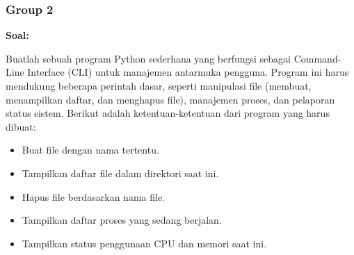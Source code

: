 \documentclass[12pt]{article}
\begin{document}
\subsubsection{Group 2}
\textbf{Soal:}
\par Buatlah sebuah program Python sederhana yang berfungsi sebagai Command-Line Interface (CLI) untuk manajemen antarmuka pengguna. Program ini harus mendukung beberapa perintah dasar, seperti manipulasi file (membuat, menampilkan daftar, dan menghapus file), manajemen proses, dan pelaporan status sistem. Berikut adalah ketentuan-ketentuan dari program yang harus dibuat:
\begin{itemize}
    \item Buat file dengan nama tertentu.
    \item Tampilkan daftar file dalam direktori saat ini.
    \item Hapus file berdasarkan nama file.
    \item Tampilkan daftar proses yang sedang berjalan.
    \item Tampilkan status penggunaan CPU dan memori saat ini.
\end{itemize}
\end{document}
